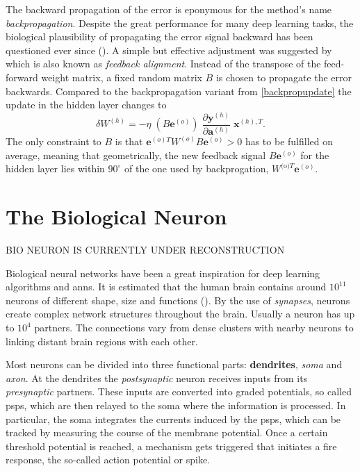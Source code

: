 The backward propagation of the error is eponymous for the method's name \textit{backpropagation}. Despite the great performance for many deep learning tasks, the biological plausibility of propagating the error signal backward has been questioned ever since (\citealp{grossberg1987competitive}). A simple but effective adjustment was suggested by \cite{lillicrap2016random} which is also known as \textit{feedback alignment}. Instead of the transpose of the feed-forward weight matrix, a fixed random matrix $B$ is chosen to propagate the error backwards. Compared to the backpropagation variant from \cref{backpropupdate} the update in the hidden layer changes to
\begin{equation*}
\delta W^{(h)} = - \eta \;
(B \mathbf{e}^{(o)}) \;
\frac{\partial \mathbf{y}^{(h)}}{\partial \mathbf{a}^{(h)}} \;
\mathbf{x}^{(h),T}.
\end{equation*}
The only constraint to $B$ is that $\mathbf{e}^{(o)T} W^{(o)} B \mathbf{e}^{(o)} > 0$ has to be fulfilled on average, meaning that geometrically, the new feedback signal $B \mathbf{e}^{(o)}$ for the hidden layer lies within $90^{\circ}$ of the one used by backprogation, $W^{\text{(o)}T} \mathbf{e}^{(o)}$.


\section{The Biological Neuron}


BIO NEURON IS CURRENTLY UNDER RECONSTRUCTION

Biological neural networks have been a great inspiration for deep learning algorithms and \glspl{ann}. It is estimated that the human brain contains around $10^{11}$ neurons of different shape, size and functions (\citealp{numberofneurons}). By the use of \emph{synapses}, neurons create complex network structures throughout the brain. Usually a neuron has up to $10^4$ partners. The connections vary from dense clusters with nearby neurons to linking distant brain regions with each other.

Most neurons can be divided into three functional parts: \textbf{dendrites}, \emph{soma} and \emph{axon}. At the dendrites the \emph{postsynaptic} neuron receives inputs from its \emph{presynaptic} partners. These inputs are converted into graded potentials, so called \glspl{psp}, which are then relayed to the soma where the information is processed. In particular, the soma integrates the currents induced by the \glspl{psp}, which can be tracked by measuring the course of the membrane potential. Once a certain threshold potential is reached, a mechanism gets triggered that initiates a fire response, the so-called action potential or spike.



